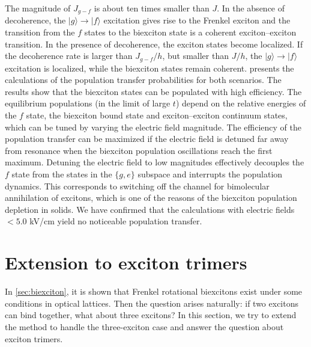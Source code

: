 The magnitude of $J_{g-f}$ is about ten times smaller than $J$.
 In the absence of decoherence, the $| g \rangle \rightarrow | f \rangle$ excitation gives rise to the Frenkel exciton and
 the transition from the $f$ states to 
 the biexciton state is a coherent exciton--exciton transition. In the presence of decoherence, the exciton states
 become localized. If the decoherence rate is larger than $J_{g-f}/h$, but smaller than $J/h$, the
 $| g \rangle \rightarrow | f \rangle$ excitation is localized, while the biexciton states remain coherent.
  presents the calculations of the population transfer probabilities for both
 scenarios. The results show that the biexciton states can be populated with high efficiency. The equilibrium
 populations (in the limit of large $t$) depend on the relative energies of the $f$ state, the biexciton bound state and
 exciton--exciton continuum states, which can be tuned by varying the electric field magnitude. 
The efficiency of the population transfer can be maximized if the electric field is detuned far away from resonance
 when the biexciton population oscillations reach the first maximum. Detuning the electric field to low magnitudes
 effectively decouples the $f$ state from the states in the $\{g,e\}$ subspace and interrupts the population dynamics.
 This corresponds to switching off the channel for bimolecular annihilation of excitons, which is one of the reasons of
 the biexciton population depletion in solids. We have confirmed that the calculations with electric fields $< 5.0$
 kV/cm yield no  noticeable population transfer. 

\section{Extension to exciton trimers}
\label{sec:trimers}
In \autoref{sec:biexciton}, it is shown that Frenkel rotational biexcitons exist under some conditions in optical lattices. 
Then the question arises naturally: if two excitons can bind together, what about three excitons? In this section, we
try to extend the method to handle the three-exciton case and answer the question about exciton trimers. 


